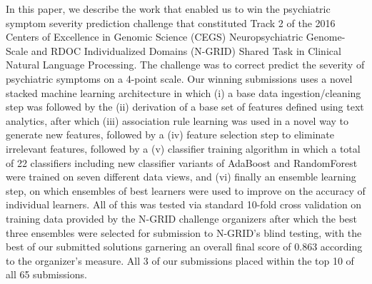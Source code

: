 In this paper, we describe the work that enabled us to win the psychiatric symptom severity prediction challenge that constituted 
Track 2 of the 2016 Centers of Excellence in Genomic Science (CEGS) Neuropsychiatric Genome-Scale and RDOC Individualized Domains (N-GRID) Shared Task in Clinical Natural Language Processing.  
The challenge was to correct predict the severity of psychiatric symptoms on a 4-point scale. Our winning submissions uses a novel stacked machine learning architecture in which (i) a base data ingestion/cleaning step was followed by the (ii) derivation of a base set of features defined using text analytics, after which 
(iii) association rule learning was used in a novel way to generate new features, followed by a (iv) feature selection step to eliminate irrelevant features, followed by a (v) classifier training algorithm in which a total of 22 classifiers including new classifier variants of AdaBoost and RandomForest were trained on seven different data views, and (vi) finally an ensemble learning step, on which
ensembles of best learners were used to improve on the accuracy of individual learners. All of this was tested via standard 10-fold cross validation on training data provided by the N-GRID challenge organizers after which the best three ensembles were selected for submission to N-GRID's blind testing, with the best of our submitted solutions garnering an overall final score of 0.863 according to the organizer's measure. 
All 3 of our submissions placed within the top 10 of all 65 submissions.
